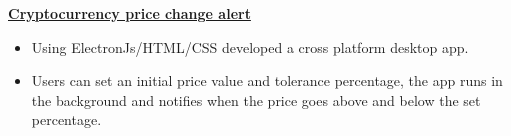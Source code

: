 \textbf{\href{https://github.com/bikz007/cryptonotifier-app}{Cryptocurrency price change alert}} \par
\begin{itemize}
	\item Using ElectronJs/HTML/CSS developed a cross platform desktop app.
	\item Users can set an initial price value and tolerance percentage, the app runs in the background and notifies when the price goes above and below the set percentage.
\end{itemize}\vspace{0.1cm}\par